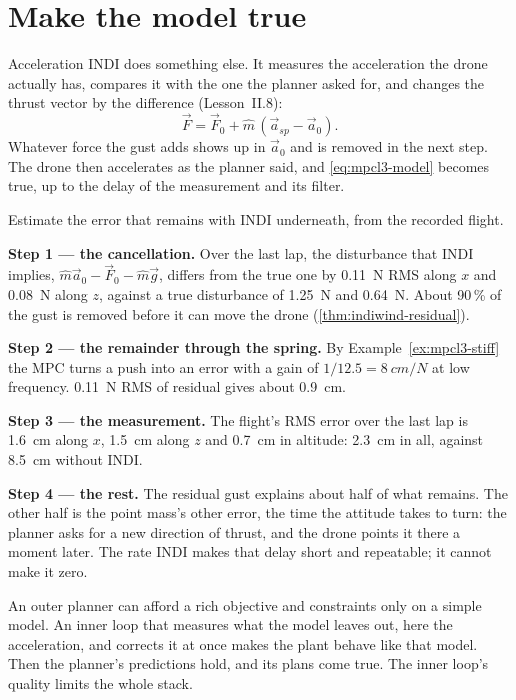\section{Make the model true}

Acceleration INDI does something else. It measures the acceleration the drone actually has, compares it with the one the planner asked for, and changes the thrust vector by the difference (Lesson~II.8):
\begin{equation}\label{eq:mpcl3-indi}
  \vec F = \vec F_0 + \hat m\,(\vec a_{sp} - \vec a_0).
\end{equation}
Whatever force the gust adds shows up in $\vec a_0$ and is removed in the next step. The drone then accelerates as the planner said, and \cref{eq:mpcl3-model} becomes true, up to the delay of the measurement and its filter.

\begin{example}
\label{ex:mpcl3-left}
Estimate the error that remains with INDI underneath, from the recorded flight.

\textbf{Step 1 — the cancellation.} Over the last lap, the disturbance that INDI implies, $\hat m\vec a_0 - \vec F_0 - \hat m\vec g$, differs from the true one by \SI{0.11}{N} RMS along $x$ and \SI{0.08}{N} along $z$, against a true disturbance of \SI{1.25}{N} and \SI{0.64}{N}. About 90\,\% of the gust is removed before it can move the drone (\cref{thm:indiwind-residual}).

\textbf{Step 2 — the remainder through the spring.} By Example~\ref{ex:mpcl3-stiff} the MPC turns a push into an error with a gain of $1/12.5 = \SI{8}{cm/N}$ at low frequency. \SI{0.11}{N} RMS of residual gives about \SI{0.9}{cm}.

\textbf{Step 3 — the measurement.} The flight's RMS error over the last lap is \SI{1.6}{cm} along $x$, \SI{1.5}{cm} along $z$ and \SI{0.7}{cm} in altitude: \SI{2.3}{cm} in all, against \SI{8.5}{cm} without INDI.

\textbf{Step 4 — the rest.} The residual gust explains about half of what remains. The other half is the point mass's other error, the time the attitude takes to turn: the planner asks for a new direction of thrust, and the drone points it there a moment later. The rate INDI makes that delay short and repeatable; it cannot make it zero.
\end{example}

\begin{keyidea}
An outer planner can afford a rich objective and constraints only on a simple model. An inner loop that measures what the model leaves out, here the acceleration, and corrects it at once makes the plant behave like that model. Then the planner's predictions hold, and its plans come true. The inner loop's quality limits the whole stack.
\end{keyidea}

